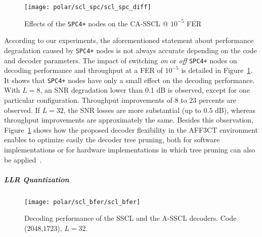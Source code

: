 \begin{figure}
  \centering
  \texttt{[image: polar/scl\_spc/scl\_spc\_diff]}
  \caption{Effects of the \texttt{SPC4+} nodes on the CA-SSCL @ $10^{-5}$ FER}
  \label{plot:polar_scl_spc}
\end{figure}

According to our experiments, the aforementioned statement about performance
degradation caused by \texttt{SPC4+} nodes is not always accurate depending on
the code and decoder parameters. The impact of switching \textit{on} or
\textit{off} \texttt{SPC4+} nodes on decoding performance and throughput at a
FER of $10^{-5}$ is detailed in Figure~\ref{plot:polar_scl_spc}. It shows that
\texttt{SPC4+} nodes have only a small effect on the decoding performance. With
$L=8$, an SNR degradation lower than 0.1 dB is observed, except for one
particular configuration. Throughput improvements of $8$ to $23$ percents are
observed. If $L=32$, the SNR losses are more substantial (up to $0.5$ dB),
whereas throughput improvements are approximately the same. Besides this
observation, Figure~\ref{plot:polar_scl_spc} shows how the proposed decoder
flexibility in the AFF3CT environment enables to optimize easily the decoder
tree pruning, both for software implementations or for hardware implementations
in which tree pruning can also be applied~\cite{Lin2014}.

\subparagraph{LLR Quantization}

\begin{figure}
  \centering
  \texttt{[image: polar/scl\_bfer/scl\_bfer]}
  \caption{Decoding performance of the SSCL and the A-SSCL decoders.
    Code ($2048$,$1723$), $L=32$.}
  \label{plot:polar_scl_bfer}
\end{figure}


